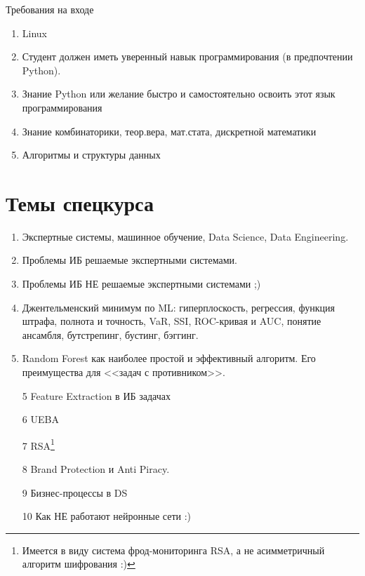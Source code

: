 \documentclass{beamer}
\begin{document}
  \begin{frame}{Требования на входе}
  \begin{enumerate}
  	\item Linux
  	\item Студент должен иметь уверенный навык программирования
  	(в предпочтении Python).
  	\item Знание Python или желание быстро и самостоятельно освоить этот 
  	язык программирования
  	\item Знание комбинаторики, теор.вера, мат.стата, дискретной математики
  	\item Алгоритмы и структуры данных
  \end{enumerate}
  \end{frame}

  \section{Темы спецкурса}\label{section:topics}
  
  \begin{frame}
	\begin{enumerate}
	\item Экспертные системы, машинное обучение, Data Science, Data Engineering.
	\item Проблемы ИБ решаемые экспертными системами.
	\item Проблемы ИБ НЕ решаемые экспертными системами ;)
	\item Джентельменский минимум по ML: гиперплоскость, регрессия, функция штрафа, полнота и точность, VaR, SSI, ROC-кривая и AUC, понятие ансамбля, бутстрепинг, бустинг, бэггинг.
	\item Random Forest как наиболее простой и эффективный алгоритм. Его преимущества для 
	<<задач с противником>>.
	\end{enumerate}
\end{frame}

  \begin{frame}
\begin{enumerate}
	\item[5] Feature Extraction в ИБ задачах
	\item[6] UEBA
	\item[7] RSA\footnote{Имеется в виду система фрод-мониторинга RSA, а не асимметричный алгоритм шифрования :)} 
	\item[8] Brand Protection и Anti Piracy.
	\item[9] Бизнес-процессы в DS
	\item[10] Как НЕ работают нейронные сети :)
\end{enumerate}
\end{frame}
\end{document}
